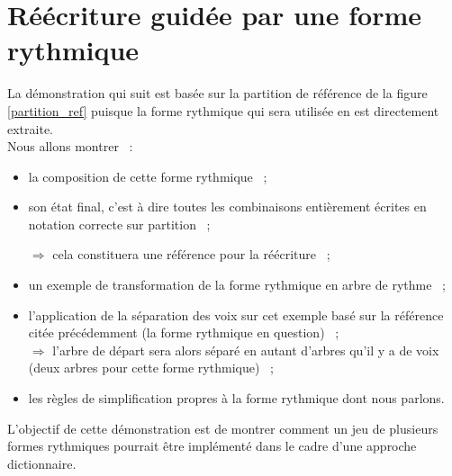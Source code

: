 \section{Réécriture guidée par une forme rythmique}
\label{reecriture_guidee}
La démonstration qui suit est basée sur la partition de référence de la figure
\ref{partition_ref} puisque la forme rythmique qui sera utilisée en est
directement extraite.\\

Nous allons montrer~ :
\begin{itemize}
    \item la composition de cette forme rythmique~ ;
    \item son état final, c’est à dire toutes les combinaisons entièrement
        écrites en notation correcte sur partition~ ;

        $\Rightarrow$ cela constituera une référence pour la réécriture~ ;
    \item un exemple de transformation de la forme rythmique en arbre de
        rythme~ ;
    \item l’application de la séparation des voix sur cet exemple basé sur la
        référence citée précédemment (la forme rythmique en question)~ ;\\
        $\Rightarrow$ l’arbre de départ sera alors séparé en autant d’arbres
        qu’il y a de voix (deux arbres pour cette forme rythmique)~ ;
    \item les règles de simplification propres à la forme rythmique dont nous
        parlons. 
\end{itemize}
L’objectif de cette démonstration est de montrer comment un jeu de plusieurs
formes rythmiques pourrait être implémenté dans le cadre d’une approche
dictionnaire.

